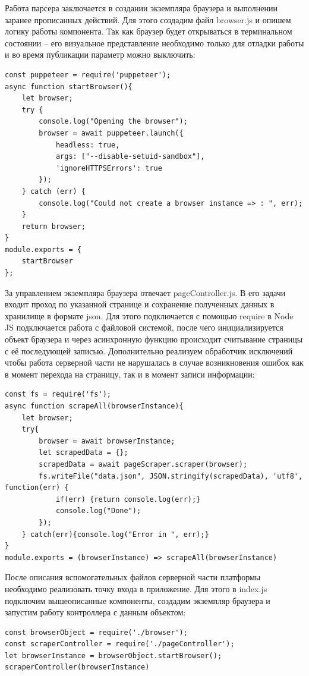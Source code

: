 \documentclass[master, och, coursework]{SCWorks}
\begin{document}
Работа парсера заключается в создании экземпляра браузера и выполнении заранее прописанных
действий. Для этого создадим файл browser.js и опишем логику работы компонента.
Так как браузер будет открываться в терминальном состоянии – его визуальное
представление необходимо только для отладки работы и во время публикации параметр 
можно выключить:
\begin{verbatim}
const puppeteer = require('puppeteer');
async function startBrowser(){
	let browser;
	try {
	    console.log("Opening the browser");
	    browser = await puppeteer.launch({
	        headless: true,
	        args: ["--disable-setuid-sandbox"],
	        'ignoreHTTPSErrors': true
	    });
	} catch (err) {
	    console.log("Could not create a browser instance => : ", err);
	}
	return browser;
}
module.exports = {
	startBrowser
};
\end{verbatim}


За управлением экземпляра браузера отвечает pageController.js. В его задачи входит
проход по указанной странице и сохранение полученных данных в хранилище в формате 
json. Для этого подключается с помощью require в Node JS подключается работа с файловой 
системой, после чего инициализируется объект браузера и через асинхронную функцию
происходит считывание страницы с её последующей записью. Дополнительно реализуем
обработчик исключений чтобы работа серверной части не нарушалась в случае возникновения
ошибок как в момент перехода на страницу, так и в момент записи информации:
\begin{verbatim}
const fs = require('fs');
async function scrapeAll(browserInstance){
    let browser;
	try{
	    browser = await browserInstance;
	    let scrapedData = {};
	    scrapedData = await pageScraper.scraper(browser);
	    fs.writeFile("data.json", JSON.stringify(scrapedData), 'utf8', function(err) {
		    if(err) {return console.log(err);}
		    console.log("Done");
	    });
    } catch(err){console.log("Error in ", err);}
}
module.exports = (browserInstance) => scrapeAll(browserInstance)
\end{verbatim}


После описания вспомогательных файлов серверной части платформы необходимо реализовать
точку входа в приложение. Для этого в index.js подключим вышеописанные компоненты,
создадим экземпляр браузера и запустим работу контроллера с данным объектом:
\begin{verbatim}
const browserObject = require('./browser');
const scraperController = require('./pageController');
let browserInstance = browserObject.startBrowser();
scraperController(browserInstance)
\end{verbatim}
\end{document}
